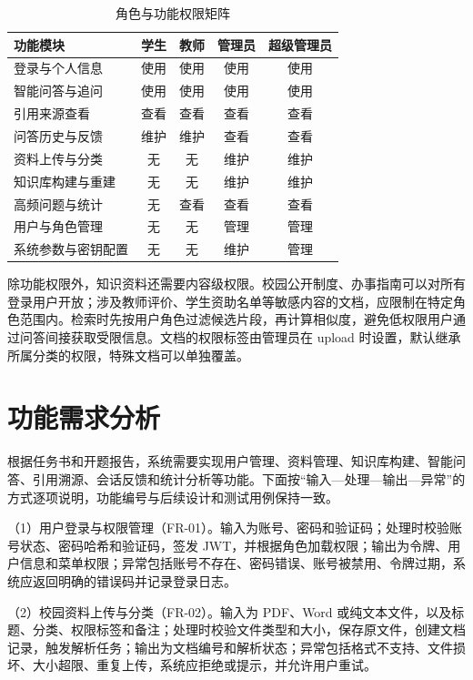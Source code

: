 \begin{table}[H]
  \centering
  \caption{角色与功能权限矩阵}
  \label{tab:role-matrix}
  \renewcommand{\arraystretch}{1.25}
  \begin{tabular}{lcccc}
    \toprule
    功能模块 & 学生 & 教师 & 管理员 & 超级管理员 \\
    \midrule
    登录与个人信息 & 使用 & 使用 & 使用 & 使用 \\
    智能问答与追问 & 使用 & 使用 & 使用 & 使用 \\
    引用来源查看 & 查看 & 查看 & 查看 & 查看 \\
    问答历史与反馈 & 维护 & 维护 & 查看 & 查看 \\
    资料上传与分类 & 无 & 无 & 维护 & 维护 \\
    知识库构建与重建 & 无 & 无 & 维护 & 维护 \\
    高频问题与统计 & 无 & 查看 & 查看 & 查看 \\
    用户与角色管理 & 无 & 无 & 管理 & 管理 \\
    系统参数与密钥配置 & 无 & 无 & 维护 & 管理 \\
    \bottomrule
  \end{tabular}
\end{table}

除功能权限外，知识资料还需要内容级权限。校园公开制度、办事指南可以对所有登录用户开放；涉及教师评价、学生资助名单等敏感内容的文档，应限制在特定角色范围内。检索时先按用户角色过滤候选片段，再计算相似度，避免低权限用户通过问答间接获取受限信息。文档的权限标签由管理员在 upload 时设置，默认继承所属分类的权限，特殊文档可以单独覆盖。

\section{功能需求分析}
\label{sec:functional}

根据任务书和开题报告，系统需要实现用户管理、资料管理、知识库构建、智能问答、引用溯源、会话反馈和统计分析等功能。下面按“输入—处理—输出—异常”的方式逐项说明，功能编号与后续设计和测试用例保持一致。

（1）用户登录与权限管理（FR-01）。输入为账号、密码和验证码；处理时校验账号状态、密码哈希和验证码，签发 JWT，并根据角色加载权限；输出为令牌、用户信息和菜单权限；异常包括账号不存在、密码错误、账号被禁用、令牌过期，系统应返回明确的错误码并记录登录日志。

（2）校园资料上传与分类（FR-02）。输入为 PDF、Word 或纯文本文件，以及标题、分类、权限标签和备注；处理时校验文件类型和大小，保存原文件，创建文档记录，触发解析任务；输出为文档编号和解析状态；异常包括格式不支持、文件损坏、大小超限、重复上传，系统应拒绝或提示，并允许用户重试。

